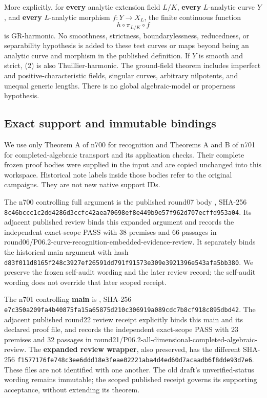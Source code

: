 \documentclass[
  11pt,
]{article}
\begin{document}
More explicitly, for \textbf{every} analytic extension field \(L/K\),
\textbf{every} \(L\)-analytic curve \(Y\), and \textbf{every}
\(L\)-analytic morphism \(f:Y\to X_L\), the finite continuous function
\[
                         h\circ\pi_{L/K}\circ f           \tag{2}
\] is GR-harmonic. No smoothness, strictness, boundarylessness,
reducedness, or separability hypothesis is added to these test curves or
maps beyond being an analytic curve and morphism in the published
definition. If \(Y\) is smooth and strict, (2) is also
Thuillier-harmonic. The ground-field theorem includes imperfect and
positive-characteristic fields, singular curves, arbitrary nilpotents,
and unequal generic lengths. There is no global algebraic-model or
properness hypothesis.

\subsection{Exact support and immutable
bindings}\label{exact-support-and-immutable-bindings}

We use only Theorem A of n700 for recognition and Theorems A and B of
n701 for completed-algebraic transport and its application checks. Their
complete frozen proof bodies were supplied in the input and are copied
unchanged into this workspace. Historical note labels inside those
bodies refer to the original campaigns. They are not new native support
IDs.

The n700 controlling full argument is the published round07 body
,
SHA-256
\texttt{8c46bccc1c2dd4286d3ccfc42aea70698ef8e449b9e57f962d707ecffd953a04}.
Its adjacent published review binds this expanded argument and records
the independent exact-scope PASS with 38 premises and 66 passages in
round06/P06.2-curve-recognition-embedded-evidence-review. It separately
binds the historical main argument with hash
\texttt{d83f011d8165f248c3927ef26591dd791f91573e309e3921396e543afa5bb380}.
We preserve the frozen self-audit wording and the later review record;
the self-audit wording does not override that later scoped receipt.

The n701 controlling \textbf{main} is
,
SHA-256
\texttt{e7c350a209fa4b40875fa15a65875d210c306919a089cdc7b8cf918c895dbd42}.
The adjacent published round22 review receipt explicitly binds this main
and its declared proof file, and records the independent exact-scope
PASS with 23 premises and 32 passages in
round21/P06.2-all-dimensional-completed-algebraic-review. The
\textbf{expanded review wrapper}, also preserved, has the different
SHA-256
\texttt{f1577176fe748c3ee6ddd18e3feae02221aba4d4ed60d7acaadb6f8dde93d7e6}.
These files are not identified with one another. The old draft's
unverified-status wording remains immutable; the scoped published
receipt governs its supporting acceptance, without extending its
theorem.
\end{document}
